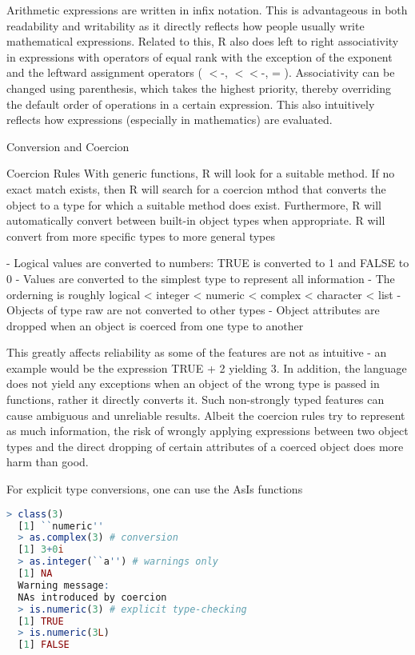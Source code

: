 \documentclass[12pt]{article}
\begin{document}
Arithmetic expressions are written in infix notation. This is advantageous in both readability and writability as it directly reflects how people usually write mathematical expressions. Related to this, R also does left to right associativity in expressions with operators of equal rank with the exception of the exponent and the leftward assignment operators ( \(<\)-, \(<<\)-, = ). Associativity can be changed using parenthesis, which takes the highest priority, thereby overriding the default order of operations in a certain expression. This also intuitively reflects how expressions (especially in mathematics) are evaluated.


Conversion and Coercion

Coercion Rules
With generic functions, R will look for a suitable method. If no exact match exists, then R will search for a coercion mthod that converts the object to a type for which a suitable method does exist. Furthermore, R will automatically convert between built-in object types when appropriate. R will convert from more specific types to more general types

- Logical values are converted to numbers: TRUE is converted to 1 and FALSE to 0
- Values are converted to the simplest type to represent all information
- The orderning is roughly logical < integer < numeric < complex < character < list
- Objects of type raw are not converted to other types
- Object attributes are dropped when an object is coerced from one type to another

This greatly affects reliability as some of the features are not as intuitive - an example would be the expression TRUE + 2 yielding 3. In addition, the language does not yield any exceptions when an object of the wrong type is passed in functions, rather it directly converts it. Such non-strongly typed features can cause ambiguous and unreliable results. Albeit the coercion rules try to represent as much information, the risk of wrongly applying expressions between two object types and the direct dropping of certain attributes of a coerced object does more harm than good.

For explicit type conversions, one can use the AsIs functions

\begin{lstlisting}[language=R]
  > class(3)
  [1] ``numeric''
  > as.complex(3) # conversion
  [1] 3+0i
  > as.integer(``a'') # warnings only
  [1] NA
  Warning message:
  NAs introduced by coercion
  > is.numeric(3) # explicit type-checking
  [1] TRUE
  > is.numeric(3L)
  [1] FALSE
\end{lstlisting}
\end{document}
